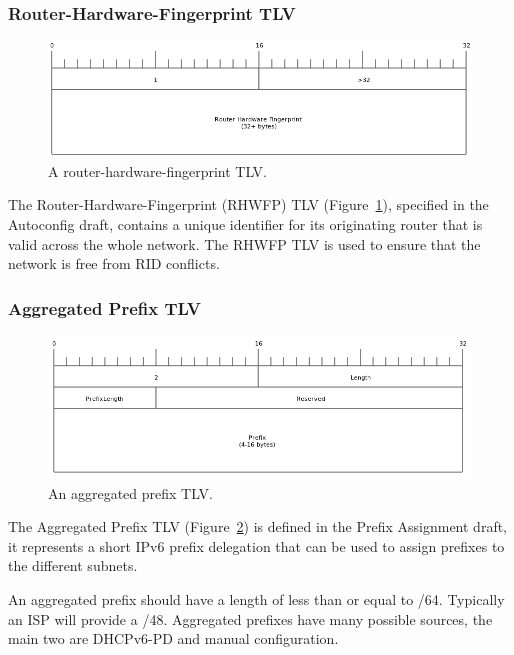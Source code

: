 \documentclass[12pt,a4paper,twoside]{report}
\begin{document}
\subsubsection{Router-Hardware-Fingerprint TLV}
\begin{figure}
\begin{center}
	\includegraphics[width=\linewidth]{../Diagrams/Packets/rhwfp_tlv.png}
	\caption{A router-hardware-fingerprint TLV.}\label{fig:RHWFP-TLV}
\end{center}
\end{figure}
The Router-Hardware-Fingerprint (RHWFP) TLV (Figure~\ref{fig:RHWFP-TLV}),
specified in the Autoconfig draft, contains a unique identifier for its
originating router that is valid across the whole network. The RHWFP TLV is
used to ensure that the network is free from RID conflicts.

\subsubsection{Aggregated Prefix TLV}
\begin{figure}
\begin{center}
	\includegraphics[width=\linewidth]{../Diagrams/Packets/aggregated_prefix_tlv.png}
	\caption{An aggregated prefix TLV.}\label{fig:AggregatedPrefix-TLV}
\end{center}
\end{figure}
The Aggregated Prefix TLV (Figure~\ref{fig:AggregatedPrefix-TLV}) is defined in
the Prefix Assignment draft, it represents a short IPv6 prefix delegation that
can be used to assign prefixes to the different subnets. 

An aggregated prefix should have a length of less than or equal to /64.
Typically an ISP will provide a /48. Aggregated prefixes have many possible
sources, the main two are DHCPv6-PD and manual configuration. 
\end{document}
